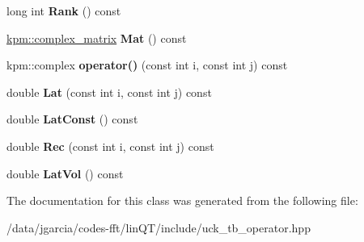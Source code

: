 \begin{DoxyCompactItemize}
\item 
long int {\bfseries Rank} () const \hypertarget{classUnitCellK__TBOp_a2f00a95f50cb6407c971ad6d9137c78a}{}\label{classUnitCellK__TBOp_a2f00a95f50cb6407c971ad6d9137c78a}

\item 
\hyperlink{classkpm_1_1dense__matrix}{kpm\+::complex\+\_\+matrix} {\bfseries Mat} () const \hypertarget{classUnitCellK__TBOp_a94439c3796e25ef034267b826e1a7a6f}{}\label{classUnitCellK__TBOp_a94439c3796e25ef034267b826e1a7a6f}

\item 
kpm\+::complex {\bfseries operator()} (const int i, const int j) const \hypertarget{classUnitCellK__TBOp_ab8f4b122b6c484ebef1b4a690dd07630}{}\label{classUnitCellK__TBOp_ab8f4b122b6c484ebef1b4a690dd07630}

\item 
double {\bfseries Lat} (const int i, const int j) const \hypertarget{classUnitCellK__TBOp_a5c056f5b6c63e2aa55985a7551982c71}{}\label{classUnitCellK__TBOp_a5c056f5b6c63e2aa55985a7551982c71}

\item 
double {\bfseries Lat\+Const} () const \hypertarget{classUnitCellK__TBOp_a8009b029b4ac23cc489ee27e7b4b28fe}{}\label{classUnitCellK__TBOp_a8009b029b4ac23cc489ee27e7b4b28fe}

\item 
double {\bfseries Rec} (const int i, const int j) const \hypertarget{classUnitCellK__TBOp_a3d1846cf347ceedfda4075f85783c1fd}{}\label{classUnitCellK__TBOp_a3d1846cf347ceedfda4075f85783c1fd}

\item 
double {\bfseries Lat\+Vol} () const \hypertarget{classUnitCellK__TBOp_a78f5ced81edc96d0bdf32e3821e1720d}{}\label{classUnitCellK__TBOp_a78f5ced81edc96d0bdf32e3821e1720d}

\end{DoxyCompactItemize}


The documentation for this class was generated from the following file\+:\begin{DoxyCompactItemize}
\item 
/data/jgarcia/codes-\/fft/lin\+Q\+T/include/uck\+\_\+tb\+\_\+operator.\+hpp\end{DoxyCompactItemize}
